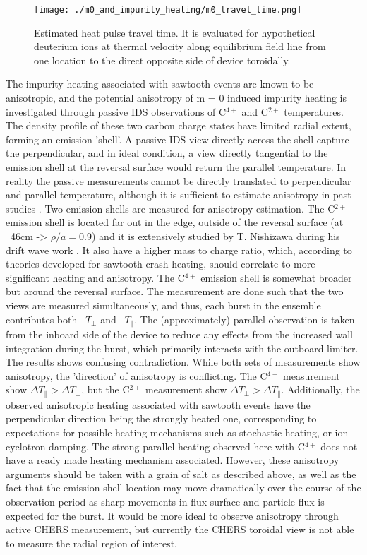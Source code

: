 \begin{figure}
	\centering
	\texttt{[image: ./m0\_and\_impurity\_heating/m0\_travel\_time.png]}
	\caption{Estimated heat pulse travel time. It is evaluated for hypothetical deuterium ions at thermal velocity along equilibrium field line from one location to the direct opposite side of device toroidally.}\label{fig:heat_travel_time}
\end{figure}

The impurity heating associated with sawtooth events are known to be anisotropic, and the potential anisotropy of m = 0 induced impurity heating is investigated through passive IDS observations of C$^{4+}$ and C$^{2+}$ temperatures. The density profile of these two carbon charge states have limited radial extent, forming an emission 'shell'. A passive IDS view directly across the shell capture the perpendicular, and in ideal condition, a view directly tangential to the emission shell at the reversal surface would return the parallel temperature. In reality the passive measurements cannot be directly translated to perpendicular and parallel temperature, although it is sufficient to estimate anisotropy in past studies \cite{Anisotropy_papers}. Two emission shells are measured for anisotropy estimation. The C$^{2+}$ emission shell is located far out in the edge, outside of the reversal surface (at ~46cm -> $\rho/a = 0.9$) and it is extensively studied by T. Nishizawa during his drift wave work \cite{Nishizawa2018, Nishizawa2018b}. It also have a higher mass to charge ratio, which, according to theories developed for sawtooth crash heating, should correlate to more significant heating and anisotropy\cite{}. The C$^{4+}$ emission shell is somewhat broader but around the reversal surface. The measurement are done such that the two views are measured simultaneously, and thus, each burst in the ensemble contributes both ~$T_{\perp}$ and ~$T_{\parallel}$. The (approximately) parallel observation is taken from the inboard side of the device to reduce any effects from the increased wall integration during the burst, which primarily interacts with the outboard limiter. The results shows confusing contradiction. While both sets of measurements show anisotropy, the 'direction' of anisotropy is conflicting. The C$^{4+}$ measurement show $\Delta T_{\parallel} > \Delta T_{\perp}$, but the C$^{2+}$ measurement show $\Delta T_{\perp} > \Delta T_{\parallel}$. Additionally, the observed anisotropic heating associated with sawtooth events have the perpendicular direction being the strongly heated one, corresponding to expectations for possible heating mechanisms such as stochastic heating, or ion cyclotron damping. The strong parallel heating observed here with C$^{4+}$ does not have a ready made heating mechanism associated. However, these anisotropy arguments should be taken with a grain of salt as described above, as well as the fact that the emission shell location may move dramatically over the course of the observation period as sharp movements in flux surface and particle flux is expected for the burst. It would be more ideal to observe anisotropy through active CHERS measurement, but currently the CHERS toroidal view is not able to measure the radial region of interest. 

